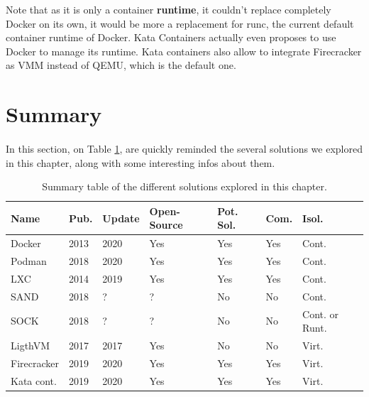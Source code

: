Note that as it is only a container \textbf{runtime}, it couldn't replace completely Docker on its own, it would be more a replacement for runc, the current default container runtime of Docker.  Kata Containers actually even proposes to use Docker to manage its runtime.  Kata containers also allow to integrate Firecracker as VMM instead of QEMU, which is the default one.

\section{Summary}
\paragraph{}In this section, on Table \ref{tab:summary}, are quickly reminded the several solutions we explored in this chapter, along with some interesting infos about them.
\begin{table}[!h]

  \begin{center}
    \begin{tabular}{|p{}|p{}|p{}|p{}|p{}|p{}|p{}|}
       \hline
       \textbf{Name} & \textbf{Pub.} & \textbf{Update} & \textbf{Open-Source} & \textbf{Pot. Sol.} & \textbf{Com.} & \textbf{Isol.} \\
       \hline
       Docker & 2013 & 2020 & Yes & Yes & Yes & Cont. \\
       \hline
       Podman & 2018 & 2020 & Yes & Yes & Yes & Cont. \\
       \hline
       LXC & 2014 & 2019 & Yes & Yes & Yes & Cont. \\
       \hline
       SAND & 2018 & ? & ? & No & No & Cont. \\
       \hline
       SOCK & 2018 & ? & ? & No & No & Cont. or Runt. \\
       \hline
       LigthVM & 2017 & 2017 & Yes & No & No & Virt. \\
       \hline
       Firecracker & 2019 & 2020 & Yes & Yes & Yes & Virt.\\
       \hline
       Kata cont. & 2019 & 2020 & Yes & Yes & Yes & Virt. \\
       \hline
    \end{tabular}
  \end{center}
  \caption{Summary table of the different solutions explored in this chapter.}
  \label{tab:summary}
\end{table}
